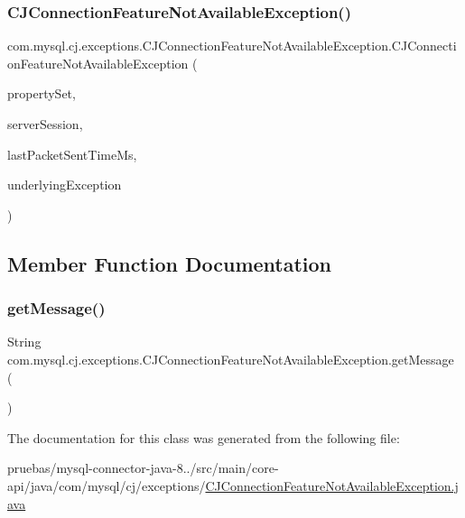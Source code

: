 \subsubsection{\texorpdfstring{C\+J\+Connection\+Feature\+Not\+Available\+Exception()}{CJConnectionFeatureNotAvailableException()}}
{\footnotesize\ttfamily com.\+mysql.\+cj.\+exceptions.\+C\+J\+Connection\+Feature\+Not\+Available\+Exception.\+C\+J\+Connection\+Feature\+Not\+Available\+Exception (\begin{DoxyParamCaption}\item[{\mbox{\hyperlink{interfacecom_1_1mysql_1_1cj_1_1conf_1_1_property_set}{Property\+Set}}}]{property\+Set,  }\item[{\mbox{\hyperlink{interfacecom_1_1mysql_1_1cj_1_1protocol_1_1_server_session}{Server\+Session}}}]{server\+Session,  }\item[{long}]{last\+Packet\+Sent\+Time\+Ms,  }\item[{Exception}]{underlying\+Exception }\end{DoxyParamCaption})}



\subsection{Member Function Documentation}
\mbox{\label{classcom_1_1mysql_1_1cj_1_1exceptions_1_1_c_j_connection_feature_not_available_exception_a9e98c1e92dcc3ff64199f23d3b68755c}} 
\subsubsection{\texorpdfstring{get\+Message()}{getMessage()}}
{\footnotesize\ttfamily String com.\+mysql.\+cj.\+exceptions.\+C\+J\+Connection\+Feature\+Not\+Available\+Exception.\+get\+Message (\begin{DoxyParamCaption}{ }\end{DoxyParamCaption})}



The documentation for this class was generated from the following file\+:\begin{DoxyCompactItemize}
\item 
pruebas/mysql-\/connector-\/java-\/8../src/main/core-\/api/java/com/mysql/cj/exceptions/\mbox{\hyperlink{_c_j_connection_feature_not_available_exception_8java}{C\+J\+Connection\+Feature\+Not\+Available\+Exception.\+java}}\end{DoxyCompactItemize}
